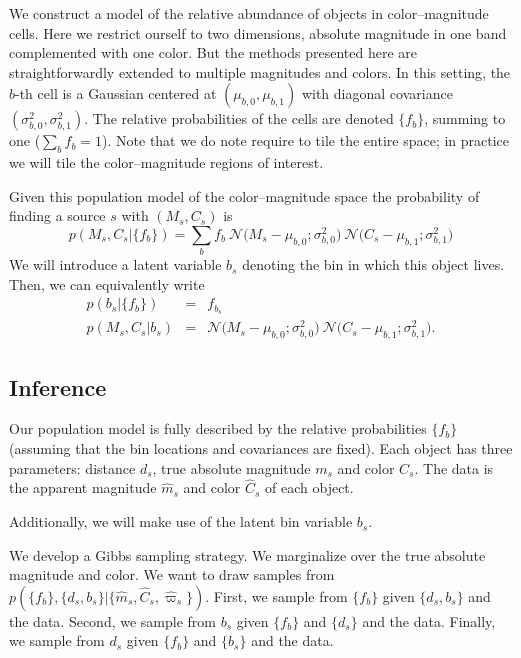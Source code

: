 \documentclass[aps,prd,showpacs,superscriptaddress,groupedaddress]{revtex4}  %
\newcommand{\equ}[1]{\begin{equation}#1\end{equation}}
\newcommand{\eqn}[1]{\begin{eqnarray}#1\end{eqnarray}}
\begin{document}
We construct a model of the relative abundance of objects in color--magnitude cells. 
Here we restrict ourself to two dimensions, absolute magnitude in one band complemented with one color.
But the methods presented here are straightforwardly extended to multiple magnitudes and colors.
In this setting, the $b$-th cell is a Gaussian centered at $(\mu_{b,0}, \mu_{b,1})$  with diagonal covariance $(\sigma_{b,0}^2, \sigma_{b,1}^2)$.
The relative probabilities of the cells are denoted $\{ f_{b} \}$, summing to one ($\sum_b f_b = 1$).
Note that we do note require to tile the entire space; in practice we will tile the color--magnitude regions of interest.

Given this population model of the color--magnitude space the probability of finding a source $s$ with $(M_s, C_s)$ is
\equ{
	p\left(M_s, C_s  \bigr\rvert \{ f_{b} \} \right) = \sum_b f_b \ \mathcal{N}\bigl(M_s - \mu_{b,0};\sigma_{b,0}^2 \bigr)  \ \mathcal{N}\bigl(C_s - \mu_{b,1};\sigma_{b,1}^2 \bigr)
}
We will introduce a latent variable $b_s$ denoting the bin in which this object lives. 
Then, we can equivalently write
\eqn{
	p\left(b_s \bigr\rvert \bigl\{ f_b \bigr\}\right) &=& f_{b_s} \\ 
	p\left(M_s, C_s \bigr\rvert b_s \right) &=& \mathcal{N}\bigl(M_s - \mu_{b,0};\sigma_{b,0}^2 \bigr)  \ \mathcal{N}\bigl(C_s - \mu_{b,1};\sigma_{b,1}^2 \bigr).
}

\subsection{Inference}

Our population model is fully described by the relative probabilities $\{ f_{b} \}$ (assuming that the bin locations and covariances are fixed). 
Each object has three parameters: distance $d_s$, true absolute magnitude $m_s$ and color $C_s$.
The data is the apparent magnitude $\hat{m}_s$ and color $\hat{C}_s$ of each object.


Additionally, we will make use of the latent bin variable $b_s$.

We develop a Gibbs sampling strategy. 
We marginalize over the true absolute magnitude and color.
We want to draw samples from $p(\{ f_{b} \},\{d_s, b_s\}  \rvert \{\hat{m}_s, \hat{C}_s, \hat{\varpi}_s\})$.
First, we sample from $\{ f_{b} \}$ given $\{d_s, b_s\}$ and the data. 
Second, we sample from $b_s$ given $\{ f_{b} \}$ and $\{d_s\}$ and the data. 
Finally, we sample from $d_s$ given $\{ f_{b} \}$ and $\{b_s\}$ and the data.
\end{document}
